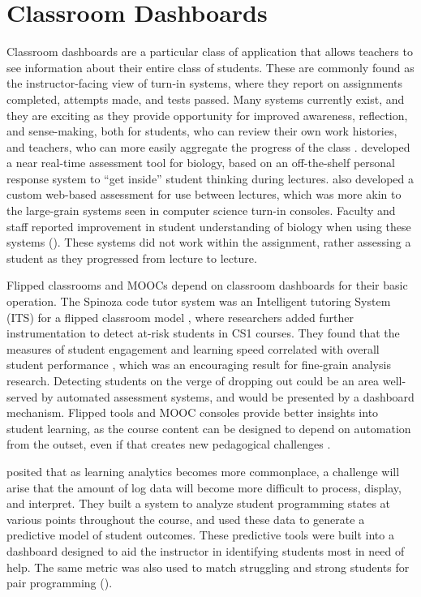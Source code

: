 \section{Classroom Dashboards}
\label{sec:teacher-dashboards}
Classroom dashboards are a particular class of application that allows teachers to see information about their entire class of students. These are commonly found as the instructor-facing view of turn-in systems, where they report on assignments completed, attempts made, and tests passed. Many systems currently exist, and they are exciting as they provide opportunity for improved awareness, reflection, and sense-making, both for students, who can review their own work histories, and teachers, who can more easily aggregate the progress of the class \citep{verbert2013learning}. \citet{Brewer:BioBytes} developed a near real-time assessment tool for biology, based on an off-the-shelf personal response system to ``get inside'' student thinking during lectures. \citeauthor{Brewer:BioBytes} also developed a custom web-based assessment for use between lectures, which was more akin to the large-grain systems seen in computer science turn-in consoles. Faculty and staff reported improvement in student understanding of biology when using these systems (\citeyear{Brewer:BioBytes}). These systems did not work within the assignment, rather assessing a student as they progressed from lecture to lecture.

Flipped classrooms and MOOCs depend on classroom dashboards for their basic operation. The Spinoza code tutor system was an Intelligent tutoring System (ITS) for a flipped classroom model \citep{Deeb15}, where researchers added further instrumentation to detect at-risk students in CS1 courses. They found that the measures of student engagement and learning speed correlated with overall student performance \citep{Tarimo:2016:EDA:2904446.2904471}, which was an encouraging result for fine-grain analysis research. Detecting students on the verge of dropping out could be an area well-served by automated assessment systems, and would be presented by a dashboard mechanism. Flipped tools and MOOC consoles provide better insights into student learning, as the course content can be designed to depend on automation from the outset, even if that creates new pedagogical challenges \citep{Martin:2012:MOO:2240236.2240246}.

\citet{Diana:2017:IDR:3027385.3027441} posited that as learning analytics becomes more commonplace, a challenge will arise that the amount of log data will become more difficult to process, display, and interpret. They built a system to analyze student programming states at various points throughout the course, and used these data to generate a predictive model of student outcomes. These predictive tools were built into a dashboard designed to aid the instructor in identifying students most in need of help. The same metric was also used to match struggling and strong students for pair programming (\citeyear{Diana:2017:IDR:3027385.3027441}).

